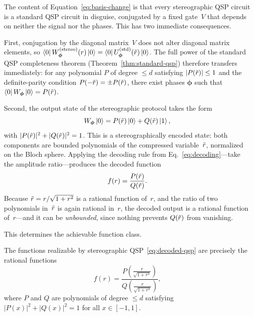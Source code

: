 The content of Equation~\eqref{eq:basis-change} is that every
stereographic QSP circuit is a standard QSP circuit in
disguise, conjugated by a fixed gate~$V$ that depends on
neither the signal nor the phases.  This has two immediate
consequences.

First, conjugation by the diagonal matrix~$V$ does not alter
diagonal matrix elements, so
$\bra{0}W_{\bm{\phi}}^{(\mathrm{stereo})}(r)\ket{0} =
	\bra{0}U_{\bm{\phi}}^{(\mathrm{std})}(\tilde{r})\ket{0}$.
The full power of the standard QSP completeness theorem
(Theorem~\ref{thm:standard-qsp}) therefore transfers
immediately: for any polynomial $P$ of degree $\leq d$
satisfying $|P(\tilde{r})| \leq 1$ and the definite-parity
condition $P(-\tilde{r}) = \pm P(\tilde{r})$, there exist phases
$\bm{\phi}$ such that
$\bra{0}W_{\bm{\phi}}\ket{0} = P(\tilde{r})$.

Second, the output state of the stereographic protocol takes the
form
\begin{equation}
	W_{\bm{\phi}}\ket{0} = P(\tilde{r})\ket{0} + Q(\tilde{r})\ket{1},
	\label{eq:qsp-state}
\end{equation}
with $|P(\tilde{r})|^2 + |Q(\tilde{r})|^2 = 1$.  This is a
stereographically encoded state: both components are bounded
polynomials of the compressed variable~$\tilde{r}$, normalized on
the Bloch sphere.  Applying the decoding rule from
Eq.~\eqref{eq:decoding}---take the amplitude
ratio---produces the decoded function
\begin{equation}
	f(r) = \frac{P(\tilde{r})}{Q(\tilde{r})}.
	\label{eq:decoded-qsp}
\end{equation}
Because $\tilde{r} = r/\sqrt{1+r^2}$ is a rational function
of~$r$, and the ratio of two polynomials in~$\tilde{r}$ is again
rational in~$r$, the decoded output is a rational function
of~$r$---and it can be \emph{unbounded}, since nothing prevents
$Q(\tilde{r})$ from vanishing.

This determines the achievable function class.

\begin{theorem}
	\label{thm:function-class}
	The functions realizable by stereographic
	QSP~\eqref{eq:decoded-qsp} are precisely the rational
	functions
	\begin{equation}
		f(r) = \frac{P\!\left(\frac{r}{\sqrt{1+r^2}}\right)}{Q\!\left(\frac{r}{\sqrt{1+r^2}}\right)},
		\label{eq:function-class}
	\end{equation}
	where $P$ and $Q$ are polynomials of degree $\leq d$ satisfying $|P(x)|^2 + |Q(x)|^2 = 1$ for all $x \in [-1,1]$.
\end{theorem}

